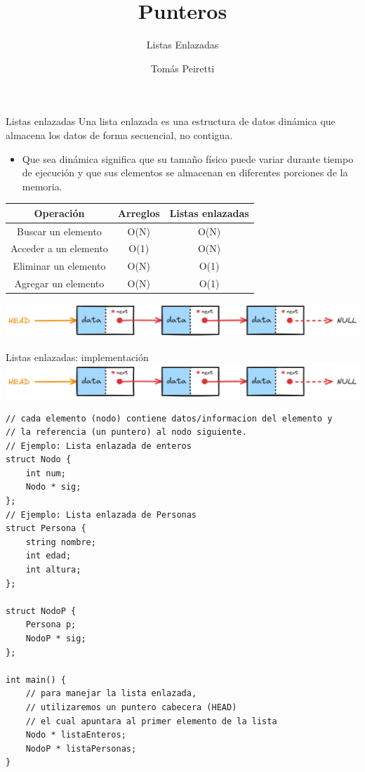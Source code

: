 \documentclass[12pt]{beamer}
\title{Punteros}
\subtitle{Listas Enlazadas}
\author{Tomás Peiretti}
\date{}
\begin{document}
\maketitle

\begin{frame}{Listas enlazadas}
    Una lista enlazada es una \alert{estructura de datos dinámica} que almacena los datos de forma secuencial, no contigua.
    \begin{itemize}
        \item Que sea dinámica significa que su tamaño físico puede variar durante tiempo de ejecución y que sus elementos se almacenan en diferentes porciones de la memoria.
    \end{itemize}
    \begin{table}[]
        \centering
        \begin{tabular}{|c|c|c|}
            \hline
            Operación & Arreglos & Listas enlazadas \\ \hline
            Buscar un elemento & O(N) & O(N) \\ \hline
            Acceder a un elemento & O(1) & O(N) \\ \hline
            Eliminar un elemento & O(N) & O(1) \\ \hline
            Agregar un elemento & O(N) & O(1) \\ \hline
        \end{tabular}
    \end{table}
    \includegraphics[width=\textwidth]{lista_enlazada.png}
\end{frame}

\begin{frame}[fragile]{Listas enlazadas: implementación}
   \includegraphics[width=\textwidth]{lista_enlazada.png}
\begin{lstlisting}[basicstyle=\tiny]
// cada elemento (nodo) contiene datos/informacion del elemento y
// la referencia (un puntero) al nodo siguiente.
// Ejemplo: Lista enlazada de enteros
struct Nodo {
    int num;
    Nodo * sig;
};
// Ejemplo: Lista enlazada de Personas
struct Persona {
    string nombre;
    int edad;
    int altura;
};

struct NodoP {
    Persona p;
    NodoP * sig;
};

int main() {
    // para manejar la lista enlazada,
    // utilizaremos un puntero cabecera (HEAD)
    // el cual apuntara al primer elemento de la lista
    Nodo * listaEnteros;
    NodoP * listaPersonas;
}
\end{lstlisting}
\end{frame}
\end{document}
